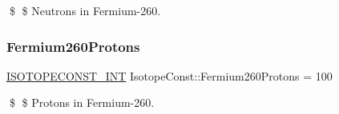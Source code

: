 \$ \$ Neutrons in Fermium-\/260. \mbox{\label{group___isotope_const-_fermium-_fm260_gab49515433ee6e54571ae215448f92300}} 
\subsubsection{\texorpdfstring{Fermium260\+Protons}{Fermium260Protons}}
{\footnotesize\ttfamily \mbox{\hyperlink{group___isotope_const-_macros_ga5f18360b3e99483a35c32d789e62621c}{I\+S\+O\+T\+O\+P\+E\+C\+O\+N\+S\+T\+\_\+\+I\+NT}} Isotope\+Const\+::\+Fermium260\+Protons = 100}

\$ \$ Protons in Fermium-\/260. 
